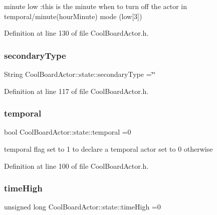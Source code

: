 minute low \+:this is the minute when to turn off the actor in temporal/minute(hour\+Minute) mode (low\mbox{[}3\mbox{]}) 

Definition at line 130 of file Cool\+Board\+Actor.\+h.

\mbox{\label{struct_cool_board_actor_1_1state_a44e8f69868f2491b79ed075f84aa0fcb}} 
\subsubsection{\texorpdfstring{secondary\+Type}{secondaryType}}
{\footnotesize\ttfamily String Cool\+Board\+Actor\+::state\+::secondary\+Type =\char`\"{}\char`\"{}}



Definition at line 117 of file Cool\+Board\+Actor.\+h.

\mbox{\label{struct_cool_board_actor_1_1state_a6442a8c3a30abc48472f3e5284b786ea}} 
\subsubsection{\texorpdfstring{temporal}{temporal}}
{\footnotesize\ttfamily bool Cool\+Board\+Actor\+::state\+::temporal =0}

temporal flag set to 1 to declare a temporal actor set to 0 otherwise 

Definition at line 100 of file Cool\+Board\+Actor.\+h.

\mbox{\label{struct_cool_board_actor_1_1state_a54cd4976b56aeaa6274fe0576aaebb0f}} 
\subsubsection{\texorpdfstring{time\+High}{timeHigh}}
{\footnotesize\ttfamily unsigned long Cool\+Board\+Actor\+::state\+::time\+High =0}



